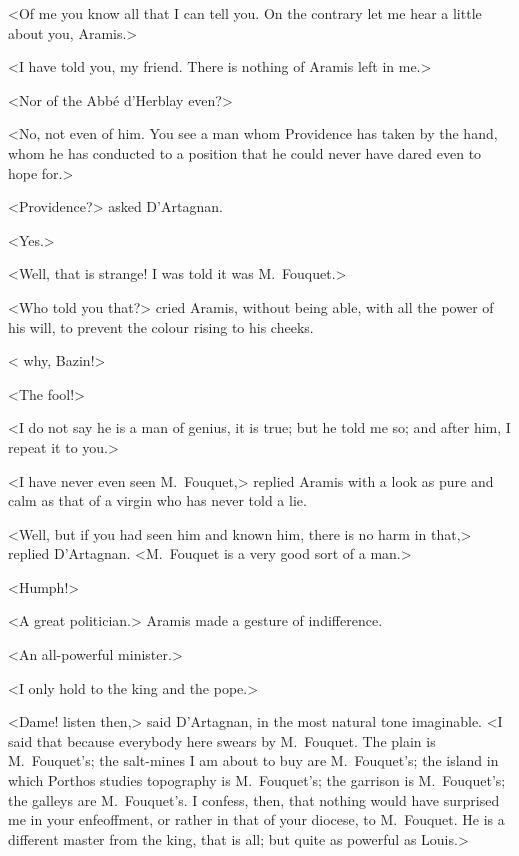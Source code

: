 <Of me you know all that I can tell you. On the contrary let me hear a little about you, Aramis.>

<I have told you, my friend. There is nothing of Aramis left in me.>

<Nor of the Abbé d'Herblay even?>

<No, not even of him. You see a man whom Providence has taken by the hand, whom he has conducted to a position that he could never have dared even to hope for.>

<Providence?> asked D'Artagnan.

<Yes.>

<Well, that is strange! I was told it was M.~Fouquet.>

<Who told you that?> cried Aramis, without being able, with all the power of his will, to prevent the colour rising to his cheeks.

< why, Bazin!>

<The fool!>

<I do not say he is a man of genius, it is true; but he told me so; and after him, I repeat it to you.>

<I have never even seen M.~Fouquet,> replied Aramis with a look as pure and calm as that of a virgin who has never told a lie.

<Well, but if you had seen him and known him, there is no harm in that,> replied D'Artagnan. <M.~Fouquet is a very good sort of a man.>

<Humph!>

<A great politician.> Aramis made a gesture of indifference.

<An all-powerful minister.>

<I only hold to the king and the pope.>

<Dame! listen then,> said D'Artagnan, in the most natural tone imaginable. <I said that because everybody here swears by M.~Fouquet. The plain is M.~Fouquet's; the salt-mines I am about to buy are M.~Fouquet's; the island in which Porthos studies topography is M.~Fouquet's; the garrison is M.~Fouquet's; the galleys are M.~Fouquet's. I confess, then, that nothing would have surprised me in your enfeoffment, or rather in that of your diocese, to M.~Fouquet. He is a different master from the king, that is all; but quite as powerful as Louis.>

